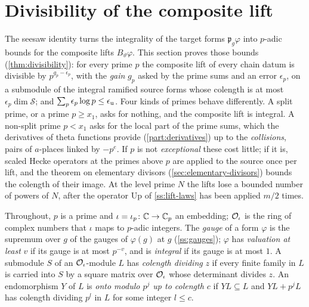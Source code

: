 \section{Divisibility of the composite lift}\label{sec:divisibility}

The seesaw identity turns the integrality of the target forms $\mathfrak p_g\varphi$ into $p$-adic bounds for the
composite lifts $B_\vartheta\varphi$. This section proves those bounds (\cref{thm:divisibility}): for every prime $p$
the composite lift of every chain datum is divisible by $p^{g_p-\epsilon_p}$, with the \emph{gain} $g_p$ asked by the
prime sums and an error $\epsilon_p$, on a submodule of the integral ramified source forms whose colength is at most
$\epsilon_p\dim\mathcal S$; and $\sum_p\epsilon_p\log p\le\epsilon_{\mathrm{u}}$. Four kinds of primes behave differently. A
split prime, or a prime $p\ge x_1$, asks for nothing, and the composite lift is integral. A non-split prime $p<x_1$
asks for the local part of the prime sums, which the derivatives of theta functions provide
(\cref{part:derivatives}) up to the \emph{collisions}, pairs of $a$-places linked by $-p^e$. If $p$ is not
\emph{exceptional} these cost little; if it is, scaled Hecke operators at the primes above $p$ are applied to the
source once per lift, and the theorem on elementary divisors (\cref{sec:elementary-divisors}) bounds the colength of
their image. At the level prime $N$ the lifts lose a bounded number of powers of $N$, after the operator
$\mathrm{Up}$ of \cref{ss:lift-laws} has been applied $m/2$ times.

Throughout, $p$ is a prime and $\iota=\iota_p\colon\mathbb{C}\to\mathbb{C}_p$ an embedding; $\mathcal{O}_\iota$ is the ring of complex numbers
that $\iota$ maps to $p$-adic integers. The \emph{gauge} of a form $\varphi$ is the supremum over $g$ of the gauges of
$\varphi(g)$ at $g$ (\cref{ss:gauges}); $\varphi$ has \emph{valuation at least} $v$ if its gauge is at most $p^{-v}$, and is
\emph{integral} if its gauge is at most $1$. A submodule $S$ of an $\mathcal{O}_\iota$-module $L$ has \emph{colength dividing}
$z$ if every finite family in $L$ is carried into $S$ by a square matrix over $\mathcal{O}_\iota$ whose determinant divides
$z$. An endomorphism $Y$ of $L$ is \emph{onto modulo $p^j$ up to colength $c$} if $Y L\subseteq L$ and $YL+p^jL$ has
colength dividing $p^l$ in $L$ for some integer $l\le c$.


